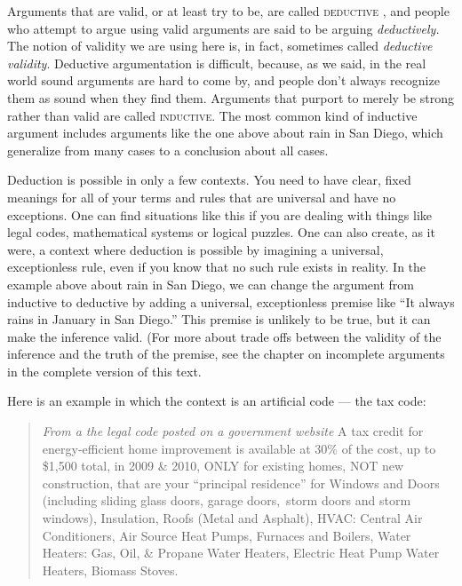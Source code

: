Arguments that are valid, or at least try to be, are called \textsc{\gls{deductive}} \label{def:deductive}, and people who attempt to argue using valid arguments are said to be arguing \textit{deductively.} The notion of validity we are using here is, in fact, sometimes called \textit{deductive validity}. Deductive argumentation is difficult, because, as we said, in the real world sound arguments are hard to come by, and people don't always recognize them as sound when they find them. Arguments that purport to merely be strong rather than valid are called \textsc{\gls{inductive}}. \label{def:inductive} The most common kind of inductive argument includes arguments like the one above about rain in San Diego, which generalize from many cases to a conclusion about all cases.

Deduction is possible in only a few contexts. You need to have clear, fixed meanings for all of your terms and rules that are universal and have no exceptions.   One can find situations like this if you are dealing with things like legal codes, mathematical systems or logical puzzles. One can also create, as it were, a context where deduction is possible by imagining a universal, exceptionless rule, even if you know that no such rule exists in reality. In the example above about rain in San Diego, we can change the argument from inductive to deductive by adding a universal, exceptionless premise like ``It always rains in January in San Diego.'' This premise is unlikely to be true, but it can make the inference valid. (For more about trade offs between the validity of the inference and the truth of the premise, see the chapter on incomplete arguments in the complete version of this text.

Here is an example in which the context is an artificial code --- the tax code:

\begin{quote} \noindent\textit{From a the legal code posted on a government website} A tax credit for energy-efficient home improvement is available at 30\% of the cost, up to \$1,500 total, in 2009 \& 2010, ONLY for existing homes, NOT new construction, that are your ``principal residence'' for Windows and Doors (including sliding glass doors, garage doors,~storm doors and storm windows), Insulation, Roofs (Metal and Asphalt), HVAC: Central Air Conditioners, Air Source Heat Pumps, Furnaces and Boilers, Water Heaters: Gas, Oil, \& Propane Water Heaters, Electric Heat Pump Water Heaters, Biomass Stoves. \end{quote}

